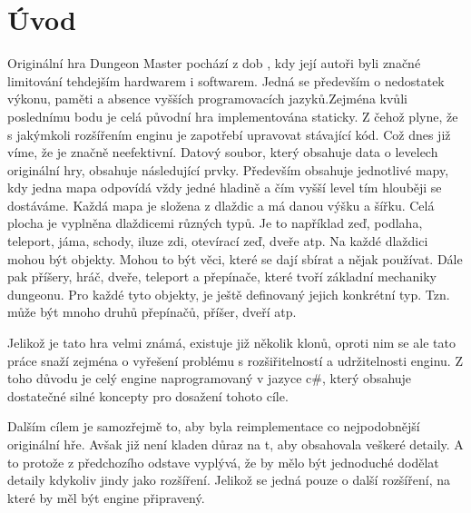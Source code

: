 ﻿\chapter{Úvod}
Originální hra Dungeon Master pochází z dob , kdy její autoři byli značné limitování tehdejším hardwarem i softwarem.
Jedná se především o nedostatek výkonu, paměti a absence vyšších programovacích jazyků.Zejména kvůli poslednímu
bodu je celá původní hra implementována staticky. Z čehož plyne, že s jakýmkoli rozšířením enginu je zapotřebí
upravovat stávající kód. Což dnes již víme, že je značně neefektivní. Datový soubor, který obsahuje data o levelech
originální hry, obsahuje následující prvky. Především obsahuje jednotlivé mapy, kdy jedna mapa odpovídá vždy jedné
hladině a čím vyšší level tím hlouběji se dostáváme. Každá mapa je složena z dlaždic a má danou výšku a šířku.
Celá plocha je vyplněna dlaždicemi různých typů. Je to například zeď, podlaha, teleport, jáma, schody, iluze zdi, 
otevírací zeď, dveře atp. Na každé dlaždici mohou být objekty. Mohou to být věci, které se dají sbírat a nějak 
používat. Dále pak příšery, hráč, dveře, teleport a přepínače, které tvoří základní mechaniky  dungeonu. Pro každé tyto
objekty, je ještě definovaný jejich konkrétní typ. Tzn. může být mnoho druhů přepínačů, příšer, dveří atp.

Jelikož je tato hra velmi známá, existuje již několik klonů, oproti nim se ale tato práce snaží zejména o vyřešení 
problému s rozšiřitelností a udržitelnosti enginu. Z toho důvodu je celý engine naprogramovaný v jazyce c\#, který
obsahuje dostatečné silné koncepty pro dosažení tohoto cíle.

Dalším cílem je samozřejmě to, aby byla reimplementace co nejpodobnější originální hře. Avšak již není kladen důraz
na t, aby obsahovala veškeré detaily. A to protože z předchozího odstave vyplývá, že by mělo být jednoduché dodělat
detaily kdykoliv jindy jako rozšíření. Jelikož se jedná pouze o další rozšíření,  na které by měl být engine připravený.



